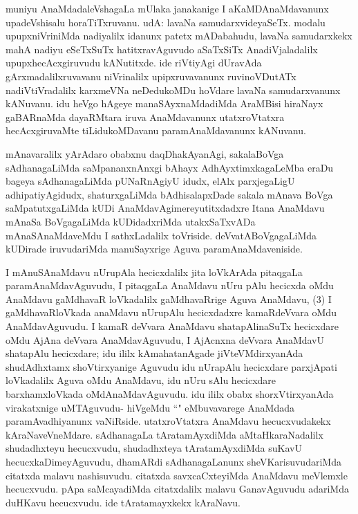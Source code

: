 \begin{artha}
muniyu AnaMdadaleVshagaLa mUlaka janakanige I aKaMDAnaMdavanunx upadeVshisalu horaTiTxruvanu. udA: lavaNa samudarxvideyaSeTx. modalu upupxniVriniMda nadiyalilx idanunx patetx mADabahudu, lavaNa samudarxkekx mahA nadiyu eSeTxSuTx hatitxravAguvudo aSaTxSiTx AnadiVjaladalilx upupxhecAcxgiruvudu kANutitxde. ide riVtiyAgi dUravAda gArxmadalilxruvavanu niVrinalilx upipxruvavanunx ruvinoVDutATx nadiVtiVradalilx karxmeVNa neDedukoMDu hoVdare lavaNa samudarxvanunx kANuvanu. idu heVgo hAgeye manaSAyxnaMdadiMda AraMBisi hiraNayx gaBARnaMda dayaRMtara iruva AnaMdavanunx utatxroVtatxra hecAcxgiruvaMte tiLidukoMDavanu paramAnaMdavanunx kANuvanu. 
\end{artha}


\begin{artha}
mAnavaralilx yArAdaro obabxnu daqDhakAyanAgi, sakalaBoVga sAdhanagaLiMda saMpananxnAnxgi bAhayx AdhAyxtimxkagaLeMba eraDu bageya sAdhanagaLiMda pUNaRnAgiyU idudx, elAlx parxjegaLigU adhipatiyAgidudx, shaturxgaLiMda bAdhisalapxDade sakala mAnava BoVga saMpatutxgaLiMda kUDi AnaMdavAgimereyutitxdadxre Itana AnaMdavu mAnaSa BoVgagaLiMda kUDidadxriMda utakxSaTxvADa mAnaSAnaMdaveMdu I sathxLadalilx toVriside. deVvatABoVgagaLiMda kUDirade iruvudariMda manuSayxrige Aguva paramAnaMdaveniside. 
\end{artha}

\begin{artha}
I mAnuSAnaMdavu nUrupAla hecicxdalilx jita loVkArAda pitaqgaLa paramAnaMdavAguvudu, I pitaqgaLa AnaMdavu nUru pAlu hecicxda oMdu AnaMdavu gaMdhavaR loVkadalilx gaMdhavaRrige Aguva AnaMdavu, (3) I gaMdhavaRloVkada anaMdavu nUrupAlu hecicxdadxre kamaRdeVvara oMdu AnaMdavAguvudu. I kamaR deVvara AnaMdavu shatapAlinaSuTx hecicxdare oMdu AjAna deVvara AnaMdavAguvudu, I AjAcnxna deVvara AnaMdavU shatapAlu hecicxdare; idu ililx kAmahatanAgade jiVteVMdirxyanAda shudAdhxtamx shoVtirxyanige Aguvudu idu nUrapAlu hecicxdare parxjApati loVkadalilx Aguva oMdu AnaMdavu, idu nUru sAlu hecicxdare barxhamxloVkada oMdAnaMdavAguvudu. idu ililx obabx shorxVtirxyanAda virakatxnige uMTAguvudu- hiVgeMdu ``\stext" eMbuvavarege AnaMdada paramAvadhiyanunx vaNiRside. utatxroVtatxra AnaMdavu hecucxvudakekx kAraNaveVneMdare. sAdhanagaLa tAratamAyxdiMda aMtaHkaraNadalilx shudadhxteyu hecucxvudu, shudadhxteya tAratamAyxdiMda suKavU hecucxkaDimeyAguvudu, dhamARdi sAdhanagaLanunx sheVKarisuvudariMda citatxda malavu nashisuvudu. citatxda savxcaCxteyiMda AnaMdavu meVlemxle hecucxvudu. pApa saMcayadiMda citatxdalilx malavu GanavAguvudu adariMda duHKavu hecucxvudu. ide tAratamayxkekx kAraNavu. 
\end{artha}%


